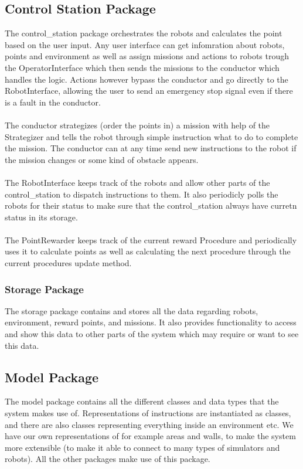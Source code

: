 \subsection{Control Station Package}
The control\_station package orchestrates the robots and calculates the point based on the user input. Any user interface can get infomration about robots, points and environment as well as assign missions and actions to robots trough the OperatorInterface which then sends the missions to the conductor which handles the logic. Actions however bypass the conductor and go directly to the RobotInterface, allowing the user to send an emergency stop signal even if there is a fault in the conductor.
\\ \\
The conductor strategizes (order the points in) a mission with help of the Strategizer and tells the robot through simple instruction what to do to complete the mission. The conductor can at any time send new instructions to the robot if the mission changes or some kind of obstacle appears.
\\ \\
The RobotInterface keeps track of the robots and allow other parts of the control\_station to dispatch instructions to them. It also periodicly polls the robots for their status to make sure that the control\_station always have curretn status in its storage.
\\ \\
The PointRewarder keeps track of the current reward Procedure and periodically uses it to calculate points as well as calculating the next procedure through the current procedures update method.

\subsubsection{Storage Package}
The storage package contains and stores all the data regarding robots, environment, reward points, and missions. It also provides functionality to access and show this data to other parts of the system which may require or want to see this data.
\subsection{Model Package}
The model package contains all the different classes and data types that the system makes use of. Representations of instructions are instantiated as classes, and there are also classes representing everything inside an environment etc. We have our own representations of for example areas and walls, to make the system more extensible (to make it able to connect to many types of simulators and robots). All the other packages make use of this package.
